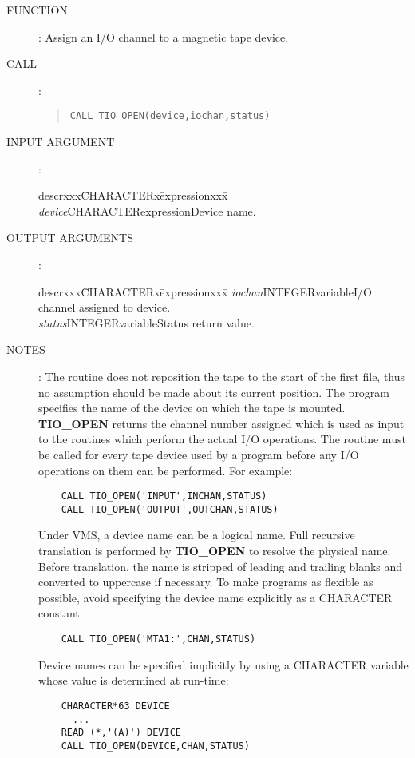 \begin{description}
\item [FUNCTION]:
Assign an I/O channel to a magnetic tape device.
\item [CALL]:
\begin{quote}
{\tt CALL TIO\_OPEN(device,iochan,status)}
\end{quote}
\item [INPUT ARGUMENT]:
\begin{tabbing}
descrxxx\=CHARACTERx\=expressionxxx\=\kill
{\em device}\>CHARACTER\>expression\>Device name.\\
\end{tabbing}
\item [OUTPUT ARGUMENTS]:
\begin{tabbing}
descrxxx\=CHARACTERx\=expressionxxx\=\kill
{\em iochan}\>INTEGER\>variable\>I/O channel assigned to device.\\
{\em status}\>INTEGER\>variable\>Status return value.
\end{tabbing}
\item [NOTES]:
The routine does not reposition the tape to the start of the first file, thus
no assumption should be made about its current position.
The program specifies the name of the device on which the tape is mounted.
{\bf TIO\_OPEN} returns the channel number assigned which is used as input to
the routines which perform the actual I/O operations.
The routine must be called for every tape device used by a program before any
I/O operations on them can be performed.
For example:
\begin{verbatim}
    CALL TIO_OPEN('INPUT',INCHAN,STATUS)
    CALL TIO_OPEN('OUTPUT',OUTCHAN,STATUS)
\end{verbatim}
Under VMS, a device name can be a logical name.
Full recursive translation is performed by {\bf TIO\_OPEN} to resolve the
physical name.
Before translation,  the name is stripped of leading and trailing blanks and
converted to uppercase if necessary.
To make programs as flexible as possible, avoid specifying the device name
explicitly as a CHARACTER constant:
\begin{verbatim}
    CALL TIO_OPEN('MTA1:',CHAN,STATUS)
\end{verbatim}
Device names can be specified implicitly by using a CHARACTER variable whose
value is determined at run-time:
\begin{verbatim}
    CHARACTER*63 DEVICE
      ...
    READ (*,'(A)') DEVICE
    CALL TIO_OPEN(DEVICE,CHAN,STATUS)
\end{verbatim}
\end{description}
